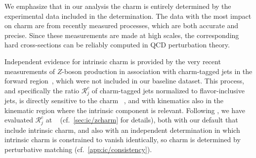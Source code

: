 We emphasize that in our analysis the charm \pdf is entirely
determined by the experimental data included in the \pdf determination.
The data with the most impact on charm are from recently measured \lhc
processes, which are both accurate and precise.
%
Since these measurements are made at high scales, the corresponding
hard cross-sections can be reliably computed in QCD perturbation theory.

Independent evidence for intrinsic charm
is provided by the very recent \lhcb measurements of $Z$-boson production
in association with charm-tagged jets in the forward
region~\cite{LHCb:2021stx}, which were not included in our baseline dataset.
%
This process, and specifically the ratio $\mathcal{R}_j^c$
of charm-tagged jets normalized to flavor-inclusive jets,
is directly sensitive to the charm \pdf~\cite{Boettcher:2015sqn}, and
with \lhcb kinematics also
in the kinematic region  where the  intrinsic component is relevant.
%
Following \cite{Boettcher:2015sqn,LHCb:2021stx}, we have  evaluated
$\mathcal{R}_j^c$ at \nlo~\cite{Alioli:2010xd,Sjostrand:2007gs} (cf.\
\cref{sec:ic/zcharm} for details), both with our default \pdfs that include
intrinsic charm, and also with an independent \pdf determination in which
intrinsic charm is constrained to vanish  identically, so charm is determined
by perturbative matching (cf.\ \cref{app:ic/consistency}).

